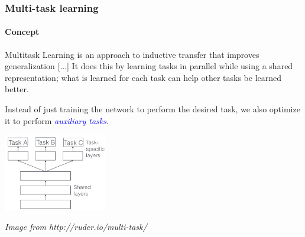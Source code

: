 \documentclass[10pt]{beamer}
\begin{document}
\begin{frame}
  \frametitle{Multi-task learning}

  \framesubtitle{Concept}

  \bigskip


  \begin{displayquote}
    Multitask Learning is an approach to inductive transfer that
    improves generalization [...] It
    does this by learning tasks in parallel while using a shared
    representation; what is learned for each task can help other tasks
    be learned better.
  \end{displayquote}

  \bigskip

  Instead of just training the network to perform the desired task, we
  also optimize it to perform \textcolor{blue}{\emph{auxiliary
      tasks}}.

  \begin{center}
    \includegraphics[width = 4.5cm]{images/multi_task_learning.png}
  \end{center}

  {\scriptsize \textit{Image from http://ruder.io/multi-task/}}
\end{frame}
\end{document}
